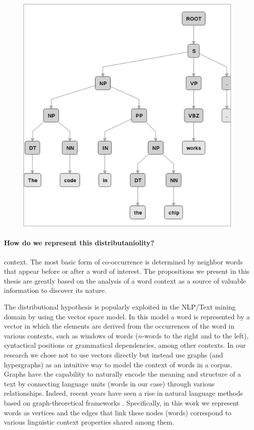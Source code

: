 \begin{figure}
\centering
\includegraphics[width=0.7\linewidth]{images/Chapitre2/exo1_constits.png}
\caption{}
\label{fig:exo1_constits}
\end{figure}


%
 

\paragraph{How do we represent this distributaniolity? }
 context. The most basic form of co-occurrence is determined by neighbor words that appear before or after a word of interest. 
The propositions we present in this thesis are greatly based on the analysis of a word context as a source of valuable information   to discover its nature. 

The distributional hypothesis is popularly exploited in the NLP/Text mining domain by using the vector space model. In this model a word is represented by a vector in which the elements are derived from the occurrences of the word in various contexts, such as windows of words ($n$-words to the right and to the left), syntactical positions or grammatical dependencies,  among other contexts. In our research we chose not to use vectors directly but instead use graphs (and hypergraphs) as an intuitive way to model the context of words in a corpus. Graphs have the capability to naturally encode the meaning and structure of a text by connecting language units (words in our case) through various relationships. Indeed, recent years have seen a rise in natural language methods based on graph-theoretical frameworks \cite{Mihalcea2011}. Specifically, in this work we represent words as vertices and the edges that link these nodes (words) correspond to various linguistic context properties shared among them. 


